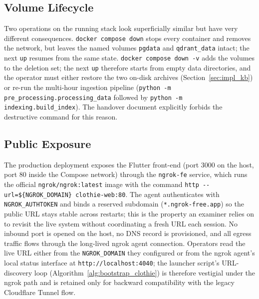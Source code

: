 \subsection{Volume Lifecycle}

Two operations on the running stack look superficially similar but have very different consequences. \texttt{docker compose down} stops every container and removes the network, but leaves the named volumes \texttt{pgdata} and \texttt{qdrant\_data} intact; the next \texttt{up} resumes from the same state. \texttt{docker compose down -v} adds the volumes to the deletion set; the next \texttt{up} therefore starts from empty data directories, and the operator must either restore the two on-disk archives (Section~\ref{sec:impl_kb}) or re-run the multi-hour ingestion pipeline (\texttt{python -m pre\_processing.processing\_data} followed by \texttt{python -m indexing.build\_index}). The handover document explicitly forbids the destructive command for this reason.

\subsection{Public Exposure}

The production deployment exposes the Flutter front-end (port 3000 on the host, port 80 inside the Compose network) through the \texttt{ngrok-fe} service, which runs the official \texttt{ngrok/ngrok:latest} image with the command \texttt{http -{}-url=\$\{NGROK\_DOMAIN\} clothie-web:80}. The agent authenticates with \texttt{NGROK\_AUTHTOKEN} and binds a reserved subdomain (\texttt{*.ngrok-free.app}) so the public URL stays stable across restarts; this is the property an examiner relies on to revisit the live system without coordinating a fresh URL each session. No inbound port is opened on the host, no DNS record is provisioned, and all egress traffic flows through the long-lived ngrok agent connection. Operators read the live URL either from the \texttt{NGROK\_DOMAIN} they configured or from the ngrok agent's local status interface at \texttt{http://localhost:4040}; the launcher script's URL-discovery loop (Algorithm~\ref{alg:bootstrap_clothie}) is therefore vestigial under the ngrok path and is retained only for backward compatibility with the legacy Cloudflare Tunnel flow.